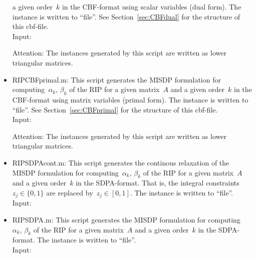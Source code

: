 \documentclass[11pt,a4paper]{article}
\newenvironment{dense_itemize}{%
  \begin{list}{$\circ$}%
    {\setlength{\topsep}{1mm}%
      \setlength{\partopsep}{0mm}%
      \setlength{\parskip}{0mm}%
      \setlength{\parsep}{0mm}%
      \setlength{\itemsep}{0mm}%
      \setlength{\labelwidth}{4mm}%
      \setlength{\leftmargin}{0mm}%
      \addtolength{\leftmargin}{\labelwidth}%
      \addtolength{\leftmargin}{\labelsep}%
      \setlength{\itemindent}{0mm}}}%
  {\end{list}}
\theoremstyle{definition}
\begin{document}
\begin{itemize}
  a given order~$k$ in the CBF-format using scalar variables (dual
  form). The instance is written to ``file''. See Section~\ref{sec:CBFdual}
  for the structure of
  this cbf-file. \\
  Input:
  Attention: The instances generated by this script are written as lower
  triangular matrices.
\item \textsf{RIPCBFprimal.m}: This script generates the MISDP formulation
  for computing~$\alpha_k,\, \beta_k$ of the RIP for a given matrix~$A$ and
  a given order~$k$ in the CBF-format using matrix variables (primal
  form). The instance is written to ``file''. See
  Section~\ref{sec:CBFprimal} for the structure of
  this cbf-file. \\
  Input:
  Attention: The instances generated by this script are written as lower
  triangular matrices. 
\item \textsf{RIPSDPAcont.m}: This script
  generates the continous relaxation of the MISDP formulation for
  computing~$\alpha_k,\, \beta_k$ of the RIP for a given matrix~$A$ and a
  given order~$k$ in the SDPA-format. That is, the integral
  constraints~$z_j \in \{0,1\}$ are replaced by~$z_j \in [0,1]$.  The
  instance is written to ``file''. \\
  Input:

\item \textsf{RIPSDPA.m}: This script generates the MISDP formulation
  for computing~$\alpha_k,\, \beta_k$ of the RIP for a given matrix~$A$ and
  a given order~$k$ in the SDPA-format. The instance is written to
  ``file''. \\
  Input:
\end{itemize}
\end{document}
